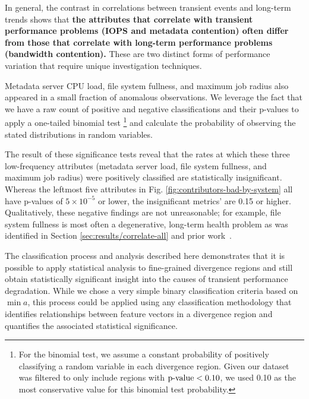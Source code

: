 In general, the contrast in correlations between transient events and
long-term trends shows that \textbf{the attributes that correlate with transient
performance problems (IOPS and
  metadata contention) often differ from those that correlate with
    long-term performance problems (bandwidth contention).} These are two distinct forms of performance variation that
require unique investigation techniques.

Metadata server CPU load, file system fullness, and maximum job radius also appeared in a small fraction of anomalous observations.
We leverage the fact that we have a raw count of positive and negative classifications and their p-values to apply a one-tailed binomial test
   \footnote{For the binomial test, we assume a constant probability of positively classifying a random variable in each divergence region.
   Given our dataset was filtered to only include regions with $\textup{p-value} < 0.10$, we used 0.10 as the most conservative value for this binomial test probability.}
and calculate the probability of observing the stated distributions in random variables.

The result of these significance tests reveal that the rates at which these three low-frequency attributes (metadata server load, file system fullness, and maximum job radius) were positively classified are statistically insignificant.
Whereas the leftmost five attributes in Fig. \ref{fig:contributors-bad-by-system} all have p-values of ${5 \times 10^{-5}}$ or lower, the insignificant metrics' are 0.15 or higher.
Qualitatively, these negative findings are not unreasonable; for example, file system fullness is most often a degenerative, long-term health problem as was identified in Section \ref{sec:results/correlate-all} and prior work~\cite{oral2014best,Lockwood2017}.

The classification process and analysis described here demonstrates that it is possible to apply statistical analysis to fine-grained divergence regions and still obtain statistically significant insight into the causes of transient performance degradation.
While we chose a very simple binary classification criteria based on $\min{a}$, this process could be applied using any classification methodology that identifies relationships between feature vectors in a divergence region and quantifies the associated statistical significance.


